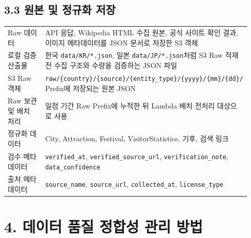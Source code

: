 \documentclass[12pt,a4paper]{article}
\newcommand{\DocNeedspace}[1]{\par\ifdim\dimexpr\pagegoal-\pagetotal\relax<#1\newpage\fi}
\begin{document}
\DocNeedspace{24\baselineskip}
\subsection*{3.3 원본 및 정규화 저장}


\DocNeedspace{20\baselineskip}
\begin{small}
\begin{longtable}{@{}>{\centering\arraybackslash}m{0.240\linewidth}>{\RaggedRight\arraybackslash}m{0.700\linewidth}@{}}
\toprule
\multicolumn{1}{>{\centering\arraybackslash}m{0.240\linewidth}}{\textbf{구분}} & \multicolumn{1}{>{\centering\arraybackslash}m{0.700\linewidth}}{\textbf{저장 내용}} \\
\midrule
\endhead
Raw 데이터 & API 응답, Wikipedia HTML 수집 원본, 공식 사이트 확인 결과, 이미지 메타데이터를 JSON 문서로 저장한 S3 객체 \\
로컬 검증 산출물 & 한국 \texttt{data/\allowbreak{}KR/\allowbreak{}*.\allowbreak{}json}, 일본 \texttt{data/\allowbreak{}JP/\allowbreak{}*.\allowbreak{}json}처럼 S3 Raw 적재 전 수집 구조와 수량을 검증하는 JSON 파일 \\
S3 Raw 객체 & \texttt{raw/\allowbreak{}\{\allowbreak{}country\allowbreak{}\}/\allowbreak{}\{\allowbreak{}source\allowbreak{}\}/\allowbreak{}\{\allowbreak{}entity\_\allowbreak{}type\allowbreak{}\}/\allowbreak{}\{\allowbreak{}yyyy\allowbreak{}\}/\allowbreak{}\{\allowbreak{}mm\allowbreak{}\}/\allowbreak{}\{\allowbreak{}dd\allowbreak{}\}/\allowbreak{}} Prefix에 저장되는 원본 JSON \\
Raw 보관 및 배치 처리 & 일정 기간 Raw Prefix에 누적한 뒤 Lambda 배치 전처리 대상으로 사용 \\
정규화 데이터 & City, Attraction, Festival, VisitorStatistics, 기후, 검색 링크 \\
검수 메타데이터 & \texttt{verified\_\allowbreak{}at}, \texttt{verified\_\allowbreak{}source\_\allowbreak{}url}, \texttt{verification\_\allowbreak{}note}, \texttt{data\_\allowbreak{}confidence} \\
출처 메타데이터 & \texttt{source\_\allowbreak{}name}, \texttt{source\_\allowbreak{}url}, \texttt{collected\_\allowbreak{}at}, \texttt{license\_\allowbreak{}type} \\
\bottomrule
\end{longtable}
\end{small}


\newpage

\DocNeedspace{10\baselineskip}
\section*{4. 데이터 품질 정합성 관리 방법}
\end{document}
